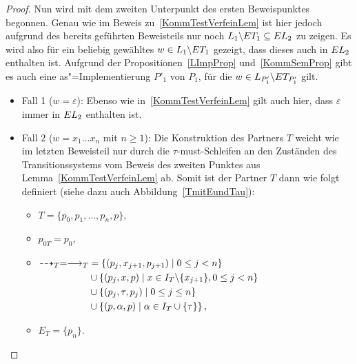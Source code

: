 \begin{proof}
  Nun wird mit dem zweiten Unterpunkt des ersten Beweispunktes begonnen. Genau
  wie im Beweis zu~\ref{KommTestVerfeinLem} ist hier jedoch aufgrund des
  bereits geführten Beweisteils nur noch $L_1\backslash ET _1\subseteq EL _2$
  zu zeigen. Es wird also für ein beliebig gewähltes $w\in L_1\backslash ET _1$
  gezeigt, dass dieses auch in $EL _2$ enthalten ist. Aufgrund der
  Propositionen~\ref{LImpProp} und~\ref{KommSemProp} gibt es auch eine
  as"=Implementierung $P'_1$ von $P_1$, für die $w\in L_{P'_1}\backslash ET
  _{P'_1}$ gilt.
  \begin{itemize}
    \item Fall 1 ($w=\varepsilon$): Ebenso wie in~\ref{KommTestVerfeinLem} gilt
      auch hier, dass $\varepsilon$ immer in $EL _2$ enthalten ist.
    \item Fall 2 ($w=x_1\dots x_n$ mit $n\geq 1$): Die Konstruktion des
      Partners $T$ weicht wie im letzten Beweisteil nur durch die
      $\tau$-must-Schleifen an den Zuständen des Transitionssystems vom Beweis
      des zweiten Punktes aus Lemma~\ref{KommTestVerfeinLem} ab. Somit ist der
      Partner $T$ dann wie folgt definiert (siehe dazu auch
      Abbildung~\ref{TmitEundTau}):
      \begin{itemize}
        \item $T=\{p_0,p_1,\dots ,p_n,p\}$,
        \item $p_{0T}=p_0$,
        \item $\begin{aligned}[t]
            \may _T = \must _T&=\left\{(p_j,x_{j+1},p_{j+1})\mid 0\leq j<
            n\right\}\\
            &\cup\left\{(p_j,x,p)\mid x\in I_T\backslash\{x_{j+1}\},0\leq j <
            n\right\}\\
            &\cup\left\{(p_j,\tau ,p_j)\mid 0\leq j\leq n\right\}\\
            &\cup\left\{(p,\alpha ,p)\mid \alpha\in I_T\cup \{\tau\}\right\},
              \end{aligned}$
        \item $E_T=\{p_n\}$.
      \end{itemize}
      \begin{figure} [h!tbp]
      \begin{center}
\end{center}
\end{figure}
\end{itemize}
\end{proof}
